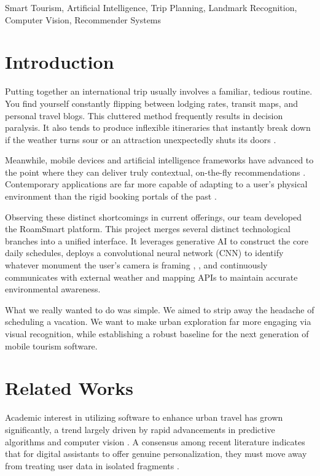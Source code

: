 \documentclass[conference]{IEEEtran}
\begin{document}
\begin{IEEEkeywords}
Smart Tourism, Artificial Intelligence, Trip Planning, Landmark Recognition, Computer Vision, Recommender Systems
\end{IEEEkeywords}

\section{Introduction}
Putting together an international trip usually involves a familiar, tedious routine. You find yourself constantly flipping between lodging rates, transit maps, and personal travel blogs. This cluttered method frequently results in decision paralysis. It also tends to produce inflexible itineraries that instantly break down if the weather turns sour or an attraction unexpectedly shuts its doors \cite{b1}. 

Meanwhile, mobile devices and artificial intelligence frameworks have advanced to the point where they can deliver truly contextual, on-the-fly recommendations \cite{b4}. Contemporary applications are far more capable of adapting to a user's physical environment than the rigid booking portals of the past \cite{b5}. 

Observing these distinct shortcomings in current offerings, our team developed the RoamSmart platform. This project merges several distinct technological branches into a unified interface. It leverages generative AI to construct the core daily schedules, deploys a convolutional neural network (CNN) to identify whatever monument the user's camera is framing \cite{b2}, \cite{b3}, and continuously communicates with external weather \cite{b7} and mapping APIs \cite{b6} to maintain accurate environmental awareness. 

What we really wanted to do was simple. We aimed to strip away the headache of scheduling a vacation. We want to make urban exploration far more engaging via visual recognition, while establishing a robust baseline for the next generation of mobile tourism software.

\section{Related Works}
Academic interest in utilizing software to enhance urban travel has grown significantly, a trend largely driven by rapid advancements in predictive algorithms and computer vision \cite{b10}. A consensus among recent literature indicates that for digital assistants to offer genuine personalization, they must move away from treating user data in isolated fragments \cite{b1}. 
\end{document}
